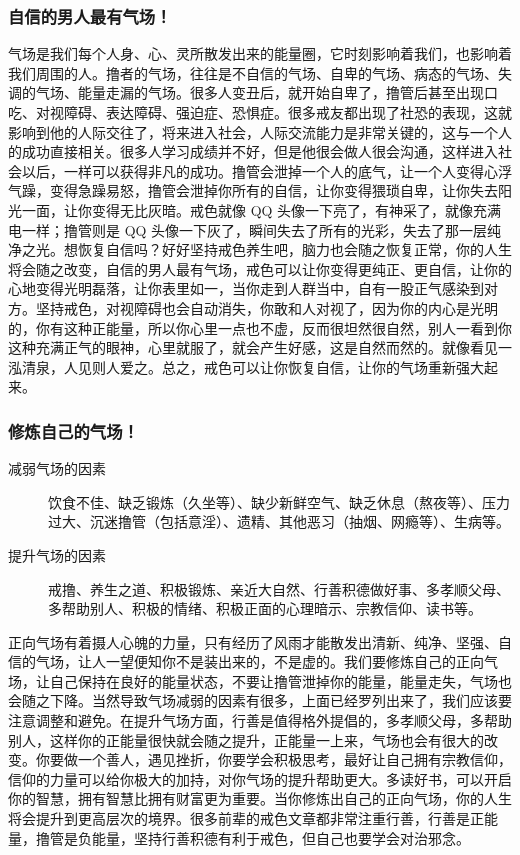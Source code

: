 \documentclass{ctexart}
\begin{document}
\subsubsection{自信的男人最有气场！}

气场是我们每个人身、心、灵所散发出来的能量圈，它时刻影响着我们，也影响着我们周围的人。撸者的气场，往往是不自信的气场、自卑的气场、病态的气场、失调的气场、能量走漏的气场。很多人变丑后，就开始自卑了，撸管后甚至出现口吃、对视障碍、表达障碍、强迫症、恐惧症。很多戒友都出现了社恐的表现，这就影响到他的人际交往了，将来进入社会，人际交流能力是非常关键的，这与一个人的成功直接相关。很多人学习成绩并不好，但是他很会做人很会沟通，这样进入社会以后，一样可以获得非凡的成功。撸管会泄掉一个人的底气，让一个人变得心浮气躁，变得急躁易怒，撸管会泄掉你所有的自信，让你变得猥琐自卑，让你失去阳光一面，让你变得无比灰暗。戒色就像 QQ 头像一下亮了，有神采了，就像充满电一样；撸管则是 QQ 头像一下灰了，瞬间失去了所有的光彩，失去了那一层纯净之光。想恢复自信吗？好好坚持戒色养生吧，脑力也会随之恢复正常，你的人生将会随之改变，自信的男人最有气场，戒色可以让你变得更纯正、更自信，让你的心地变得光明磊落，让你表里如一，当你走到人群当中，自有一股正气感染到对方。坚持戒色，对视障碍也会自动消失，你敢和人对视了，因为你的内心是光明的，你有这种正能量，所以你心里一点也不虚，反而很坦然很自然，别人一看到你这种充满正气的眼神，心里就服了，就会产生好感，这是自然而然的。就像看见一泓清泉，人见则人爱之。总之，戒色可以让你恢复自信，让你的气场重新强大起来。

\subsubsection{修炼自己的气场！}

\begin{description}
    \item[减弱气场的因素] 饮食不佳、缺乏锻炼（久坐等）、缺少新鲜空气、缺乏休息（熬夜等）、压力过大、沉迷撸管（包括意淫）、遗精、其他恶习（抽烟、网瘾等）、生病等。
    \item[提升气场的因素] 戒撸、养生之道、积极锻炼、亲近大自然、行善积德做好事、多孝顺父母、多帮助别人、积极的情绪、积极正面的心理暗示、宗教信仰、读书等。
\end{description}

正向气场有着摄人心魄的力量，只有经历了风雨才能散发出清新、纯净、坚强、自信的气场，让人一望便知你不是装出来的，不是虚的。我们要修炼自己的正向气场，让自己保持在良好的能量状态，不要让撸管泄掉你的能量，能量走失，气场也会随之下降。当然导致气场减弱的因素有很多，上面已经罗列出来了，我们应该要注意调整和避免。在提升气场方面，行善是值得格外提倡的，多孝顺父母，多帮助别人，这样你的正能量很快就会随之提升，正能量一上来，气场也会有很大的改变。你要做一个善人，遇见挫折，你要学会积极思考，最好让自己拥有宗教信仰，信仰的力量可以给你极大的加持，对你气场的提升帮助更大。多读好书，可以开启你的智慧，拥有智慧比拥有财富更为重要。当你修炼出自己的正向气场，你的人生将会提升到更高层次的境界。很多前辈的戒色文章都非常注重行善，行善是正能量，撸管是负能量，坚持行善积德有利于戒色，但自己也要学会对治邪念。
\end{document}
